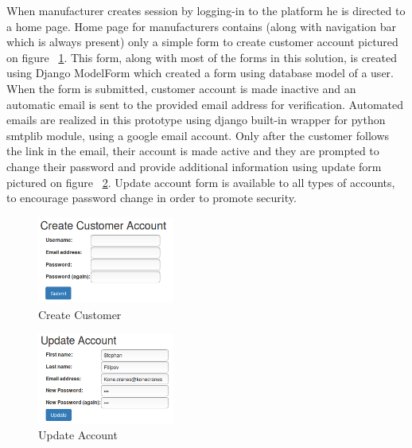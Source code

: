 When manufacturer creates session by logging-in to the platform he is directed to a home page. Home page for manufacturers contains (along with navigation bar which is always present) only a simple form to create customer account pictured on figure ~\ref{fig:CreateCustomer}. This form, along with most of the forms in this solution, is created using Django ModelForm which created a form using database model of a user. When the form is submitted, customer account is made inactive and an automatic email is sent to the provided email address for verification. Automated emails are realized in this prototype using django built-in wrapper for python smtplib module, using a google email account. Only after the customer follows the link in the email, their account is made active and they are prompted to change their password and provide additional information using update form pictured on figure ~\ref{fig:UpdateAccount}. Update account form is available to all types of accounts, to encourage password change in order to promote security.

\begin{figure}
	\begin{center}
		\includegraphics[width=0.4\textwidth]{images/implementation/CreateCustomer}
		\caption{Create Customer}
		\label{fig:CreateCustomer}
	\end{center}
\end{figure}

\begin{figure}[ht]
	\begin{center}
		\includegraphics[width=0.4\textwidth]{images/implementation/UpdateAccount}
		\caption{Update Account}
		\label{fig:UpdateAccount}
	\end{center}
\end{figure}

